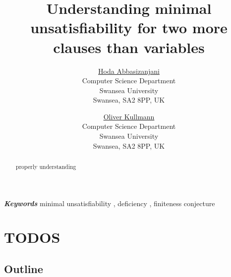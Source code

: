 \documentclass{article}
\newcommand{\Liste}{minimal unsatisfiability \sep deficiency \sep finiteness conjecture}
\providecommand{\keywords}[1]{\textbf{\textit{Keywords}} #1}
\providecommand{\sep}{, }
\begin{document}
\title{Understanding minimal unsatisfiability for two more clauses than variables}

\author{
  \href{XXX}{Hoda Abbasizanjani}\\
  Computer Science Department\\
  Swansea University\\
  Swansea, SA2 8PP, UK
  \and
  \href{http://cs.swan.ac.uk/~csoliver}{Oliver Kullmann}\\
  Computer Science Department\\
  Swansea University\\
  Swansea, SA2 8PP, UK
}

\maketitle

\begin{abstract}
  properly understanding
\end{abstract}

\keywords{\Liste}

\tableofcontents


\setcounter{section}{-1}
\section{TODOS}
\label{sec:todos}


\subsection{Outline}
\label{sec:Outline}
\end{document}
